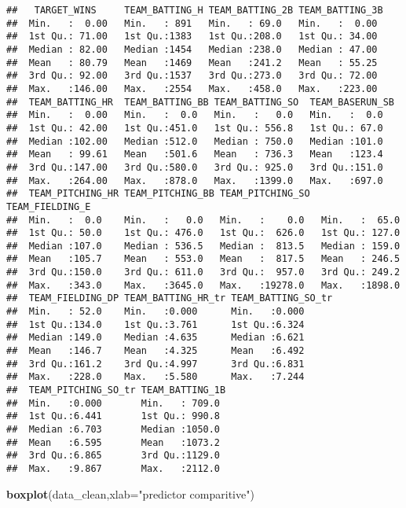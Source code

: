 \documentclass[]{article}
\newenvironment{Shaded}{\begin{snugshade}}{\end{snugshade}}
\newcommand{\KeywordTok}[1]{\textcolor[rgb]{0.13,0.29,0.53}{\textbf{#1}}}
\newcommand{\DataTypeTok}[1]{\textcolor[rgb]{0.13,0.29,0.53}{#1}}
\newcommand{\StringTok}[1]{\textcolor[rgb]{0.31,0.60,0.02}{#1}}
\newcommand{\NormalTok}[1]{#1}
\begin{document}
\begin{verbatim}
##   TARGET_WINS     TEAM_BATTING_H TEAM_BATTING_2B TEAM_BATTING_3B 
##  Min.   :  0.00   Min.   : 891   Min.   : 69.0   Min.   :  0.00  
##  1st Qu.: 71.00   1st Qu.:1383   1st Qu.:208.0   1st Qu.: 34.00  
##  Median : 82.00   Median :1454   Median :238.0   Median : 47.00  
##  Mean   : 80.79   Mean   :1469   Mean   :241.2   Mean   : 55.25  
##  3rd Qu.: 92.00   3rd Qu.:1537   3rd Qu.:273.0   3rd Qu.: 72.00  
##  Max.   :146.00   Max.   :2554   Max.   :458.0   Max.   :223.00  
##  TEAM_BATTING_HR  TEAM_BATTING_BB TEAM_BATTING_SO  TEAM_BASERUN_SB
##  Min.   :  0.00   Min.   :  0.0   Min.   :   0.0   Min.   :  0.0  
##  1st Qu.: 42.00   1st Qu.:451.0   1st Qu.: 556.8   1st Qu.: 67.0  
##  Median :102.00   Median :512.0   Median : 750.0   Median :101.0  
##  Mean   : 99.61   Mean   :501.6   Mean   : 736.3   Mean   :123.4  
##  3rd Qu.:147.00   3rd Qu.:580.0   3rd Qu.: 925.0   3rd Qu.:151.0  
##  Max.   :264.00   Max.   :878.0   Max.   :1399.0   Max.   :697.0  
##  TEAM_PITCHING_HR TEAM_PITCHING_BB TEAM_PITCHING_SO  TEAM_FIELDING_E 
##  Min.   :  0.0    Min.   :   0.0   Min.   :    0.0   Min.   :  65.0  
##  1st Qu.: 50.0    1st Qu.: 476.0   1st Qu.:  626.0   1st Qu.: 127.0  
##  Median :107.0    Median : 536.5   Median :  813.5   Median : 159.0  
##  Mean   :105.7    Mean   : 553.0   Mean   :  817.5   Mean   : 246.5  
##  3rd Qu.:150.0    3rd Qu.: 611.0   3rd Qu.:  957.0   3rd Qu.: 249.2  
##  Max.   :343.0    Max.   :3645.0   Max.   :19278.0   Max.   :1898.0  
##  TEAM_FIELDING_DP TEAM_BATTING_HR_tr TEAM_BATTING_SO_tr
##  Min.   : 52.0    Min.   :0.000      Min.   :0.000     
##  1st Qu.:134.0    1st Qu.:3.761      1st Qu.:6.324     
##  Median :149.0    Median :4.635      Median :6.621     
##  Mean   :146.7    Mean   :4.325      Mean   :6.492     
##  3rd Qu.:161.2    3rd Qu.:4.997      3rd Qu.:6.831     
##  Max.   :228.0    Max.   :5.580      Max.   :7.244     
##  TEAM_PITCHING_SO_tr TEAM_BATTING_1B 
##  Min.   :0.000       Min.   : 709.0  
##  1st Qu.:6.441       1st Qu.: 990.8  
##  Median :6.703       Median :1050.0  
##  Mean   :6.595       Mean   :1073.2  
##  3rd Qu.:6.865       3rd Qu.:1129.0  
##  Max.   :9.867       Max.   :2112.0
\end{verbatim}

\begin{Shaded}
\begin{Highlighting}[]
\KeywordTok{boxplot}\NormalTok{(data_clean,}\DataTypeTok{xlab=}\StringTok{"predictor comparitive"}\NormalTok{)}
\end{Highlighting}
\end{Shaded}
\end{document}
